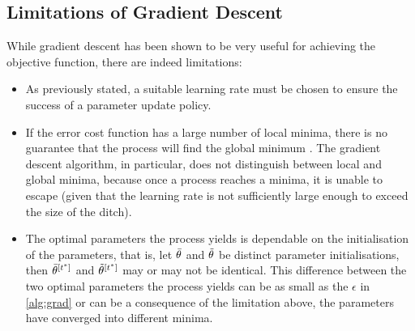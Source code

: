 \subsection{Limitations of Gradient Descent}
While gradient descent has been shown to be very useful for achieving the objective function, there are indeed limitations:

\begin{itemize}[leftmargin=*]
    \item As previously stated, a suitable learning rate must be chosen to ensure the success of a parameter update policy. 
    \item If the error cost function has a large number of local minima, there is no guarantee that the process will find the global minimum \parencite{298667}.
    The gradient descent algorithm, in particular, does not distinguish between local and global minima, because once a process reaches a minima, it is unable to escape (given that the learning rate is not sufficiently large enough to exceed the size of the ditch). 
    \item The optimal parameters the process yields is dependable on the initialisation of the parameters, that is, let $\Bar{\theta}$ and $\Tilde{\theta}$ be distinct parameter initialisations, then $\Bar{\theta}^{[t^*]}$ and $\Tilde{\theta}^{[t^*]}$ may or may not be identical. This difference between the two optimal parameters the process yields can be as small as the $\epsilon$ in \cref{alg:grad} or can be a consequence of the limitation above, the parameters have converged into different minima.
\end{itemize}
